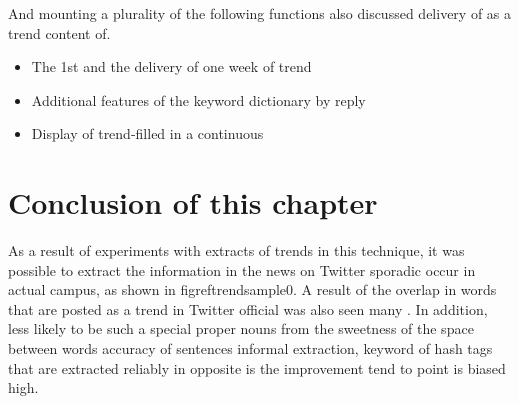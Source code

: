 And mounting a plurality of the following functions also discussed delivery of as a trend content of.

\begin{itemize}
    \item The 1st and the delivery of one week of trend
    \item Additional features of the keyword dictionary by reply
    \item Display of trend-filled in a continuous
\end{itemize}


\section{Conclusion of this chapter}
As a result of experiments with extracts of trends in this technique, it was possible to extract the information in the news on Twitter sporadic occur in actual campus, as shown in figref{trendsample0}.
A result of the overlap in words that are posted as a trend in Twitter official was also seen many . In addition, less likely to be such a special proper nouns from the sweetness of the space between words accuracy of sentences informal extraction, keyword of hash tags that are extracted reliably in opposite is the improvement tend to point is biased high.

